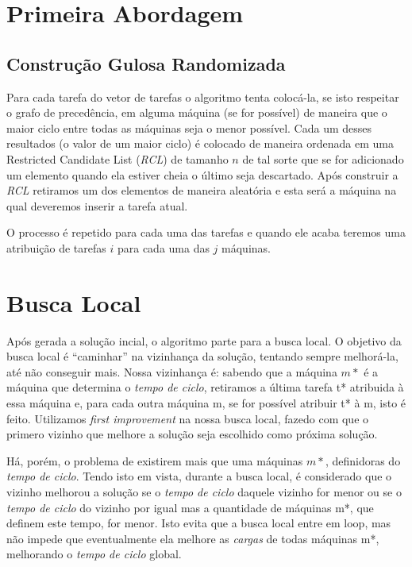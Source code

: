 \documentclass{report}
\begin{document}
\section{Primeira Abordagem}

\subsection{Construção Gulosa Randomizada}

Para cada tarefa do vetor de tarefas o algoritmo tenta colocá-la, se
isto respeitar o grafo de precedência, em alguma
máquina (se for possível) de maneira que o maior ciclo entre todas as máquinas
seja o menor possível. Cada um desses resultados (o valor de um maior ciclo)
é colocado de maneira ordenada em uma Restricted Candidate List (\emph{RCL})
de tamanho $n$ de tal sorte que se for adicionado um elemento quando ela estiver
cheia o último seja descartado. Após construir a \emph{RCL} retiramos um dos
elementos de maneira aleatória e esta será a máquina na qual deveremos inserir
a tarefa atual.

O processo é repetido para cada uma das tarefas e quando ele acaba teremos
uma atribuição de tarefas $i$ para cada uma das $j$ máquinas.

\section{Busca Local}

Após gerada a solução incial, o algoritmo parte para a busca local.
O objetivo da busca local é ``caminhar'' na
vizinhança da solução, tentando sempre melhorá-la, até não conseguir mais.
Nossa vizinhança é: sabendo que a máquina $m*$
é a máquina que determina o \emph{tempo de ciclo},
retiramos a última tarefa t* atribuida à essa máquina e, para cada
outra máquina m, se for possível atribuir t* à m, isto é feito.
Utilizamos \textit{first improvement} na nossa busca
local, fazedo com que o primero vizinho que melhore a solução seja
escolhido como próxima solução.

Há, porém, o problema de existirem mais que uma máquinas $m*$,
definidoras do \emph{tempo de ciclo}. Tendo isto em vista,
durante a busca local, é considerado que o vizinho melhorou a
solução se o \emph{tempo de ciclo} daquele vizinho for
menor ou se o \emph{tempo de ciclo} do vizinho por igual mas a
quantidade de máquinas m*, que definem este tempo, for
menor. Isto evita que a busca local entre em loop, mas não impede que
eventualmente ela melhore as \emph{cargas} de
todas máquinas m*, melhorando o \emph{tempo de ciclo} global.
\end{document}
